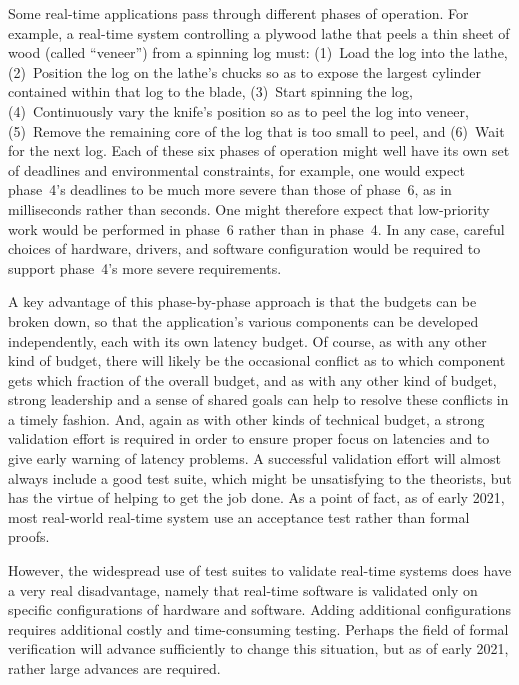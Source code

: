 Some real-time applications pass through different phases of operation.
For example, a real-time system controlling a plywood lathe that peels
a thin sheet of wood (called ``veneer'') from a spinning log must:
(1)~Load the log into the lathe,
(2)~Position the log on the lathe's chucks so as to expose the largest
cylinder contained within that log to the blade,
(3)~Start spinning the log,
(4)~Continuously vary the knife's position so as to peel the log into veneer,
(5)~Remove the remaining core of the log that is too small to peel, and
(6)~Wait for the next log.
Each of these six phases of operation might well have its own set of
deadlines and environmental constraints,
for example, one would expect phase~4's deadlines to be much more severe
than those of phase~6, as in milliseconds rather than seconds.
One might therefore expect that low-priority work would be performed in
phase~6 rather than in phase~4.
In any case, careful choices of hardware, drivers, and software
configuration would be required to support phase~4's more severe
requirements.

A key advantage of this phase-by-phase approach is that the 
budgets can be broken down, so that the application's various components
can be developed independently, each with its own latency budget.
Of course, as with any other kind of budget, there will likely be the
occasional conflict as to which component gets which fraction of the
overall budget, and as with any other kind of budget, strong leadership
and a sense of shared goals can help to resolve these conflicts in
a timely fashion.
And, again as with other kinds of technical budget, a strong validation
effort is required in order to ensure proper focus on latencies and to
give early warning of latency problems.
A successful validation effort will almost always include a good test
suite, which might be unsatisfying to the theorists, but has the virtue
of helping to get the job done.
As a point of fact, as of early 2021, most real-world real-time system
use an acceptance test rather than formal proofs.

However, the widespread use of test suites to validate real-time systems
does have a very real disadvantage, namely that real-time software is
validated only on specific configurations of hardware and software.
Adding additional configurations requires additional costly and
time-consuming testing.
Perhaps the field of formal verification will advance sufficiently to
change this situation, but as of early 2021, rather
large advances are required.

